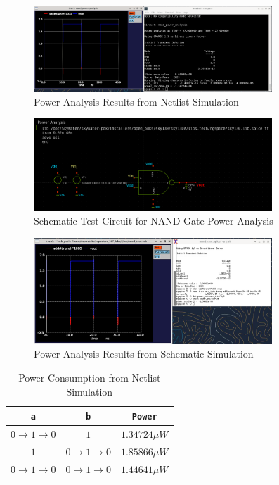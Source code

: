 \documentclass{article}
\begin{document}
	\begin{figure}[H]
		\centerline{\includegraphics[width=0.8\textwidth]{nand_power_analysis.png}}
		\caption{Power Analysis Results from Netlist Simulation}
		\label{fig::nand_power_analysis}
	\end{figure}
	
	\begin{figure}[H]
		\centerline{\includegraphics[width=0.8\textwidth]{nand_power_analysis_test_circuit.png}}
		\caption{Schematic Test Circuit for NAND Gate Power Analysis}
		\label{fig::nand_power_analysis_test_circuit_schem}
	\end{figure}
	
	\begin{figure}[H]
		\centerline{\includegraphics[width=0.8\textwidth]{nand_power_analysis_schem.png}}
		\caption{Power Analysis Results from Schematic Simulation}
		\label{fig::nand_power_analysis_schem}
	\end{figure}
	
	\begin{table}[H]
	\begin{center}
	\caption{Power Consumption from Netlist Simulation}
	\label{table::nand_gate_power_analysis}
	\begin{tabular}{| c | c | c |}
		\hline
		\texttt{a} & \texttt{b} & \texttt{Power}\\
		\hline	
		$0 \rightarrow 1 \rightarrow 0$ & $1$ & $1.34724{\mu}W$ \\
		\hline	
		$1$ & $0 \rightarrow 1 \rightarrow 0$ & $1.85866{\mu}W$ \\
		\hline	
		$0 \rightarrow 1 \rightarrow 0$ & $0 \rightarrow 1 \rightarrow 0$ & $1.44641{\mu}W$\\
		\hline
	\end{tabular}
	\end{center}
	\end{table}
	
\end{document}
